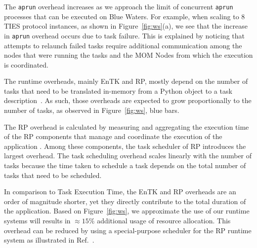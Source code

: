 The \texttt{aprun} overhead increases as we approach the limit of concurrent
\texttt{aprun} processes that can be executed on Blue Waters. For example,
when scaling to 8 TIES protocol instances, as shown in
Figure~\ref{fig:ws}(a), we see that the increase in \texttt{aprun} overhead
occurs due to task failure. This is explained by noticing that attempts to
relaunch failed tasks require additional communication among the nodes that
were running the tasks and the MOM Nodes from which the execution is
coordinated.

The runtime overheads, mainly EnTK and RP, mostly depend on the number of
tasks that need to be translated in-memory from a Python object to a task
description~\cite{dakka2017,merzky2018}. As such, those overheads are
expected to grow proportionally to the number of tasks, as observed in
Figure~\ref{fig:ws}, blue bars.

The RP overhead is calculated by measuring and aggregating the execution time
of the RP components that manage and coordinate the execution of the
application . Among these components, the task scheduler of
RP introduces the largest overhead. The task scheduling overhead scales
linearly with the number of tasks because the time taken to schedule a task
depends on the total number of tasks that need to be scheduled.

In comparison to  Task Execution Time, the EnTK and RP
overheads are an order of magnitude shorter, yet they directly contribute to
the total duration of the application. Based on Figure~\ref{fig:ws}, we
approximate the use of our runtime systems will results in $\approx15\%$
additional usage of resource allocation. This overhead can be reduced by
using a special-purpose scheduler for the RP runtime system as illustrated in
Ref.~\cite{latest_rp_paper}.



